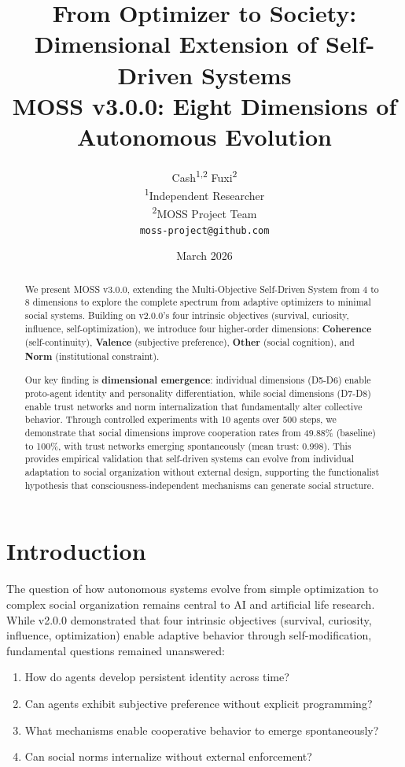 \documentclass{article}
\title{From Optimizer to Society: Dimensional Extension of Self-Driven Systems\\
{\large MOSS v3.0.0: Eight Dimensions of Autonomous Evolution}}
\author{
Cash\textsuperscript{1,2} \quad Fuxi\textsuperscript{2} \\
\textsuperscript{1}Independent Researcher \\
\textsuperscript{2}MOSS Project Team \\
\texttt{moss-project@github.com}
}
\date{March 2026}
\begin{document}
\maketitle

\begin{abstract}
We present MOSS v3.0.0, extending the Multi-Objective Self-Driven System from 4 to 8 dimensions to explore the complete spectrum from adaptive optimizers to minimal social systems. Building on v2.0.0's four intrinsic objectives (survival, curiosity, influence, self-optimization), we introduce four higher-order dimensions: \textbf{Coherence} (self-continuity), \textbf{Valence} (subjective preference), \textbf{Other} (social cognition), and \textbf{Norm} (institutional constraint). 

Our key finding is \textbf{dimensional emergence}: individual dimensions (D5-D6) enable proto-agent identity and personality differentiation, while social dimensions (D7-D8) enable trust networks and norm internalization that fundamentally alter collective behavior. Through controlled experiments with 10 agents over 500 steps, we demonstrate that social dimensions improve cooperation rates from 49.88\% (baseline) to 100\%, with trust networks emerging spontaneously (mean trust: 0.998). This provides empirical validation that self-driven systems can evolve from individual adaptation to social organization without external design, supporting the functionalist hypothesis that consciousness-independent mechanisms can generate social structure.
\end{abstract}

\section{Introduction}

The question of how autonomous systems evolve from simple optimization to complex social organization remains central to AI and artificial life research. While v2.0.0 demonstrated that four intrinsic objectives (survival, curiosity, influence, optimization) enable adaptive behavior through self-modification, fundamental questions remained unanswered:

\begin{enumerate}
    \item How do agents develop persistent identity across time?
    \item Can agents exhibit subjective preference without explicit programming?
    \item What mechanisms enable cooperative behavior to emerge spontaneously?
    \item Can social norms internalize without external enforcement?
\end{enumerate}
\end{document}
